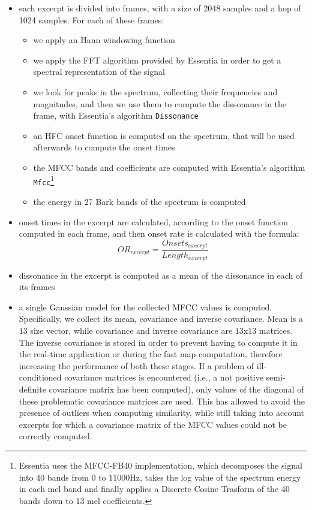 \begin{itemize}
\item each excerpt is divided into frames, with a size of 2048 samples and a hop of 1024 samples. For each of these frames:
\begin{itemize}
\item we apply an Hann windowing function
\item we apply the FFT algorithm provided by Essentia in order to get a spectral representation of the signal
\item we look for peaks in the spectrum, collecting their frequencies and magnitudes, and then we use them to compute the dissonance in the frame, with Essentia's algorithm \texttt{Dissonance}
\item an HFC onset function is computed on the spectrum, that will be used afterwards to compute the onset times
\item the MFCC bands and coefficients are computed with Essentia's algorithm \texttt{Mfcc}\footnote{Essentia uses the MFCC-FB40 implementation, which decomposes the signal into 40 bands from 0 to 11000Hz, takes the log value of the spectrum energy in each mel band and finally applies a Discrete Cosine Trasform of the 40 bands down to 13 mel coefficients.} 
\item the energy in 27 Bark bands of the spectrum is computed 
\end{itemize}
\item onset times in the excerpt are calculated, according to the onset function computed in each frame, and then onset rate is calculated with the formula:
\begin{equation}
OR_{excerpt} = \frac{Onsets_{excerpt}}{Length_{excerpt}}
\end{equation}
\item dissonance in the excerpt is computed as a mean of the dissonance in each of its frames
\item a single Gaussian model for the collected MFCC values is computed. Specifically, we collect its mean, covariance and inverse covariance. Mean is a $13$ size vector, while covariance and inverse covariance are $13$x$13$ matrices. The inverse covariance is stored in order to prevent having to compute it in the real-time application or during the fast map computation, therefore increasing the performance of both these stages. If a problem of ill-conditioned covariance matrices is encountered (i.e., a not positive semi-definite covariance matrix has been computed), only values of the diagonal of these problematic covariance matrices are used. This has allowed to avoid the presence of outliers when computing similarity, while still taking into account excerpts for which a covariance matrix of the MFCC values could not be correctly computed. 

\end{itemize}
